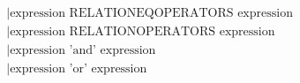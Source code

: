 \begin{align*}
                & \mid \text{expression RELATIONEQOPERATORS expression}                                                                                                                       \\ %
                & \mid \text{expression RELATIONOPERATORS expression}                                                                                                                         \\ %
                & \mid \text{expression 'and' expression}                                                                                                                                     \\ %
                & \mid \text{expression 'or' expression}                                                                                                                                      \\ %
\end{align*}
